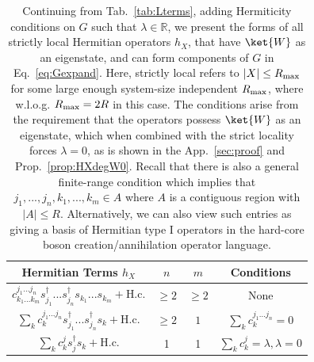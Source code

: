 \documentclass[prx,letterpaper,aps,superscriptaddress,floatfix,twocolumn,nofootinbib]{revtex4-2}
\theoremstyle{definition}
\begin{document}
\begin{table}[t]
    \centering
    \begin{tabular}{c|c|c|c}
        Hermitian Terms $h_X$ & $n$ & $m$ & Conditions\\\hline
        $c^{j_1...j_n}_{k_1...k_m} s_{j_1}^\dag ... s_{j_n}^\dag s_{k_1} ... s_{k_m} + \text{H.c.}$  & $\geq 2$ & $\geq 2$ & None\\
        $\sum_k c^{j_1...j_n}_{k} s_{j_1}^\dag ... s_{j_n}^\dag s_{k} + \text{H.c.}$ & $\geq 2$ & $1$ & $\sum_k c^{j_1...j_n}_{k}=0$ \\
        $ \sum_k c^j_k s_j^\dag s_k + \text{H.c.}$ & 1 & 1 & $\sum_{k}c^j_{k}=\lambda,\lambda=0$ \\
    \end{tabular}
    \caption{
    Continuing from Tab.~\ref{tab:Lterms}, adding Hermiticity conditions on $G$ such that $\lambda\in\mathbb{R}$, we present the forms of all strictly local Hermitian operators $h_X$, that have $\ket{W}$ as an eigenstate, and can form components of $G$ in Eq.~\eqref{eq:Gexpand}.
    Here, strictly local refers to $|X|\leq R_{\rm max}$ for some large enough system-size independent $R_{\rm max}$, where w.l.o.g. $R_{\rm max}=2R$ in this case.
    The conditions arise from the requirement that the operators possess $\ket{W}$ as an eigenstate, which when combined with the strict locality forces $\lambda=0$, as is shown in the App.~\ref{sec:proof} and Prop.~\ref{prop:HXdegW0}.
    Recall that there is also a general finite-range condition which implies that $j_1,...,j_n,k_1,...,k_m\in A$ where $A$ is a contiguous region with $|A|\leq R$.
    Alternatively, we can also view such entries as giving a basis of Hermitian type I operators in the hard-core boson creation/annihilation operator language.
    }
    \label{tab:HIterms}
\end{table}
%

%
\end{document}
